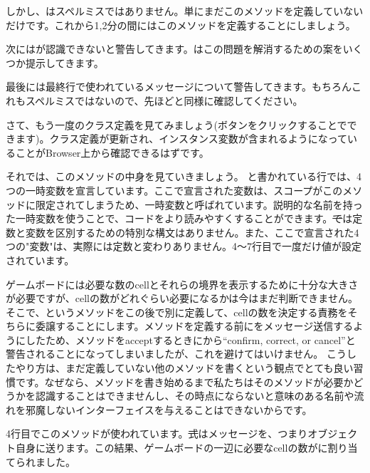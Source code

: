 \documentclass[a4paper,10pt,twoside]{book}
\begin{document}
しかし、はスペルミスではありません。単にまだこのメソッドを定義していないだけです。これから1,2分の間にはこのメソッドを定義することにしましょう。


次に\pharo はが認識できないと警告してきます。\pharo はこの問題を解消するための案をいくつか提示してきます。


最後に\pharo は最終行で使われているメッセージについて警告してきます。もちろんこれもスペルミスではないので、先ほどと同様に確認してください。


さて、もう一度のクラス定義を見てみましょう(ボタンをクリックすることでできます)。クラス定義が更新され、インスタンス変数が含まれるようになっていることがBrowser上から確認できるはずです。

それでは、このメソッドの中身を見ていきましょう。
と書かれている行では、4つの一時変数を宣言しています。ここで宣言された変数は、スコープがこのメソッドに限定されてしまうため、一時変数と呼ばれています。説明的な名前を持った一時変数を使うことで、コードをより読みやすくすることができます。\st では定数と変数を区別するための特別な構文はありません。また、ここで宣言された4つの"変数"は、実際には定数と変わりありません。4〜7行目で一度だけ値が設定されています。

ゲームボードには必要な数のcellとそれらの境界を表示するために十分な大きさが必要ですが、cellの数がどれぐらい必要になるかは今はまだ判断できません。そこで、というメソッドをこの後で別に定義して、cellの数を決定する責務をそちらに委譲することにします。メソッドを定義する前にをメッセージ送信するようにしたため、メソッドをacceptするときに\pharo から``confirm, correct, or cancel''と警告されることになってしまいましたが、これを避けてはいけません。
こうしたやり方は、まだ定義していない他のメソッドを書くという観点でとても良い習慣です。なぜなら、メソッドを書き始めるまで私たちはそのメソッドが必要かどうかを認識することはできませんし、その時点にならないと意味のある名前や流れを邪魔しないインターフェイスを与えることはできないからです。

4行目でこのメソッドが使われています。\st 式はメッセージを、つまりオブジェクト自身に送ります。この結果、ゲームボードの一辺に必要なcellの数がに割り当てられました。
\end{document}
